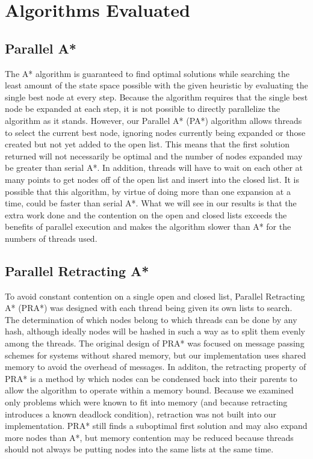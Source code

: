 \documentclass{article}
\begin{document}
\section{Algorithms Evaluated}
\subsection{Parallel A*}
The A* algorithm \cite{hart:fbh} is guaranteed to find optimal solutions while searching the least amount of the state space possible with the given heuristic by evaluating the single best node at every step. Because the algorithm requires that the single best node be expanded at each step, it is not possible to directly parallelize the algorithm as it stands. However, our Parallel A* (PA*) algorithm allows threads to select the current best node, ignoring nodes currently being expanded or those created but not yet added to the open list. This means that the first solution returned will not necessarily be optimal and the number of nodes expanded may be greater than serial A*. In addition, threads will have to wait on each other at many points to get nodes off of the open list and insert into the closed list. It is possible that this algorithm, by virtue of doing more than one expansion at a time, could be faster than serial A*. What we will see in our results is that the extra work done and the contention on the open and closed lists exceeds the benefits of parallel execution and makes the algorithm slower than A* for the numbers of threads used.
\subsection{Parallel Retracting A*}
To avoid constant contention on a single open and closed list, Parallel Retracting A* (PRA*) was designed with each thread being given its own lists to search. The determination of which nodes belong to which threads can be done by any hash, although ideally nodes will be hashed in such a way as to split them evenly among the threads. The original design of PRA* was focused on message passing schemes for systems without shared memory, but our implementation uses shared memory to avoid the overhead of messages. In additon, the retracting property of PRA* is a method by which nodes can be condensed back into their parents to allow the algorithm to operate within a memory bound. Because we examined only problems which were known to fit into memory (and because retracting introduces a known deadlock condition), retraction was not built into our implementation. PRA* still finds a suboptimal first solution and may also expand more nodes than A*, but memory contention may be reduced because threads should not always be putting nodes into the same lists at the same time.
\end{document}
